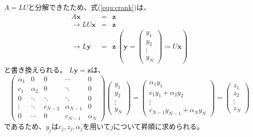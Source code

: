 \documentclass[a4j, titlepage]{jsarticle}
\numberwithin{equation}{section}
\begin{document}
        $A = LU$と分解できたため、式(\ref{equ:crank})は、
        \begin{eqnarray*}
            A\bm{x} &=& \bm{z} \\
            \rightarrow LU\bm{x} &=& \bm{z} \\
            \rightarrow L\bm{y} &=& \bm{z} \ \left(\bm{y} = \begin{pmatrix}
                y_1 \\
                y_2 \\
                \vdots \\
                y_N
            \end{pmatrix} \coloneqq U\bm{x}\right)
        \end{eqnarray*}
        と書き換えられる。
        $L\bm{y} = \bm{z}$は、
        \begin{equation*}
            \begin{pmatrix}
                \alpha_1 & 0 & 0 & \cdots & 0 \\
                c_1 & \alpha_2 & 0 & \ddots & 0 \\
                0 & \ddots & \ddots & \ddots & 0 \\
                \vdots & \ddots & c_{N - 2} & \alpha_{N - 1} & 0 \\
                0 & \cdots & 0 & c_{N - 1} & \alpha_N
            \end{pmatrix}\begin{pmatrix}
                y_1 \\
                y_2 \\
                \vdots \\
                y_N
            \end{pmatrix} = \begin{pmatrix}
                \alpha_1y_1 \\
                c_1y_1 + \alpha_2y_2 \\
                \vdots \\
                c_{N - 1}y_{N - 1} + \alpha_Ny_N
            \end{pmatrix} = \begin{pmatrix}
                z_1 \\
                z_2 \\
                \vdots \\
                z_N
            \end{pmatrix}
        \end{equation*}
        であるため、$y_j$は$c_j, z_j, \alpha_j$を用いて$j$について昇順に求められる。
\end{document}
